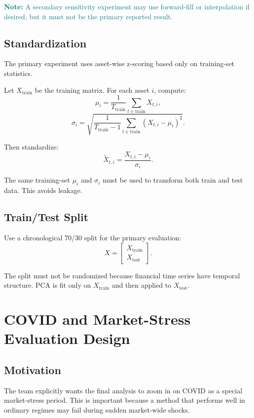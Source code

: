 \documentclass[11pt]{article}
\newcommand{\note}[1]{\textcolor{teal}{\textbf{Note:} #1}}
\begin{document}
\note{A secondary sensitivity experiment may use forward-fill or interpolation if desired, but it must not be the primary reported result.}

\subsection{Standardization}

The primary experiment uses asset-wise z-scoring based only on training-set statistics.

Let $X_{\text{train}}$ be the training matrix. For each asset $i$, compute:
\[
\mu_i = \frac{1}{T_{\text{train}}} \sum_{t \in \text{train}} X_{t,i},
\]
\[
\sigma_i = \sqrt{
\frac{1}{T_{\text{train}} - 1}
\sum_{t \in \text{train}} (X_{t,i} - \mu_i)^2
}.
\]

Then standardize:
\[
\widetilde{X}_{t,i}
=
\frac{X_{t,i} - \mu_i}{\sigma_i}.
\]

The same training-set $\mu_i$ and $\sigma_i$ must be used to transform both train and test data. This avoids leakage.

\subsection{Train/Test Split}

Use a chronological 70/30 split for the primary evaluation:
\[
X =
\begin{bmatrix}
X_{\text{train}} \\
X_{\text{test}}
\end{bmatrix}.
\]

The split must not be randomized because financial time series have temporal structure. PCA is fit only on $X_{\text{train}}$ and then applied to $X_{\text{test}}$.

\section{COVID and Market-Stress Evaluation Design}

\subsection{Motivation}

The team explicitly wants the final analysis to zoom in on COVID as a special market-stress period. This is important because a method that performs well in ordinary regimes may fail during sudden market-wide shocks.
\end{document}
